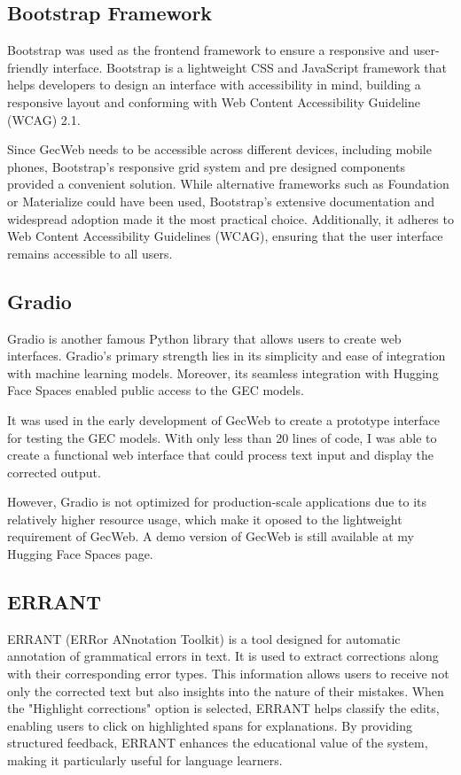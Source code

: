 \subsection{Bootstrap Framework}
\label{bootstrap-framework}

Bootstrap was used as the frontend framework to ensure a responsive and user-friendly interface.
Bootstrap is a lightweight CSS and JavaScript framework that helps developers to design an interface with accessibility in mind, building a responsive layout and conforming with Web Content Accessibility Guideline (WCAG) 2.1.

Since GecWeb needs to be accessible across different devices, including mobile phones, Bootstrap's responsive grid system and pre designed components provided a convenient solution.
While alternative frameworks such as Foundation or Materialize could have been used, Bootstrap's extensive documentation and widespread adoption made it the most practical choice.
Additionally, it adheres to Web Content Accessibility Guidelines (WCAG), ensuring that the user interface remains accessible to all users.

\subsection{Gradio}
\label{gradio}

Gradio is another famous Python library that allows users to create web interfaces.
Gradio's primary strength lies in its simplicity and ease of integration with machine learning models.
Moreover, its seamless integration with Hugging Face Spaces enabled public access to the GEC models.

It was used in the early development of GecWeb to create a prototype interface for testing the GEC models.
With only less than 20 lines of code, I was able to create a functional web interface that could process text input and display the corrected output.

However, Gradio is not optimized for production-scale applications due to its relatively higher resource usage, which make it oposed to the lightweight requirement of GecWeb.
A demo version of GecWeb is still available at my Hugging Face Spaces page.

\subsection{ERRANT}

ERRANT (ERRor ANnotation Toolkit) is a tool designed for automatic annotation of grammatical errors in text.
It is used to extract corrections along with their corresponding error types.
This information allows users to receive not only the corrected text but also insights into the nature of their mistakes.
When the "Highlight corrections" option is selected, ERRANT helps classify the edits, enabling users to click on highlighted spans for explanations.
By providing structured feedback, ERRANT enhances the educational value of the system, making it particularly useful for language learners.

